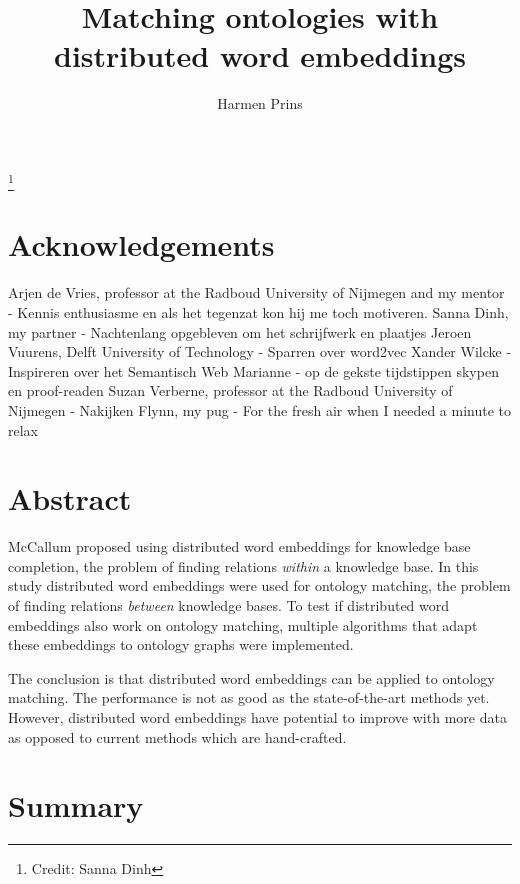 \documentclass{article}
\title{Matching ontologies with distributed word embeddings}
\author{Harmen Prins}
\begin{document}
 \maketitle
 
 \footnote{Credit: Sanna Dinh}
 \newpage
 
 \section*{Acknowledgements}
 Arjen de Vries, professor at the Radboud University of Nijmegen and my mentor - Kennis enthusiasme en als het tegenzat kon hij me toch motiveren.
 Sanna Dinh, my partner - Nachtenlang opgebleven om het schrijfwerk en plaatjes
 Jeroen Vuurens, Delft University of Technology - Sparren over word2vec
 Xander Wilcke - Inspireren over het Semantisch Web
 Marianne - op de gekste tijdstippen skypen en proof-readen
 Suzan Verberne, professor at the Radboud University of Nijmegen - Nakijken
 Flynn, my pug - For the fresh air when I needed a minute to relax
 
 \section*{Abstract}
 McCallum proposed using distributed word embeddings for knowledge base completion, the problem of finding relations \textit{within} a knowledge base. In this study distributed word embeddings were used for ontology matching, the problem of finding relations \textit{between} knowledge bases. To test if distributed word embeddings also work on ontology matching, multiple algorithms that adapt these embeddings to ontology graphs were implemented.
 
 The conclusion is that distributed word embeddings can be applied to ontology matching. The performance is not as good as the state-of-the-art methods yet. However, distributed word embeddings have potential to improve with more data as opposed to current methods which are hand-crafted.
 
 \section*{Summary}
 \tableofcontents
 \newpage
 
\end{document}
